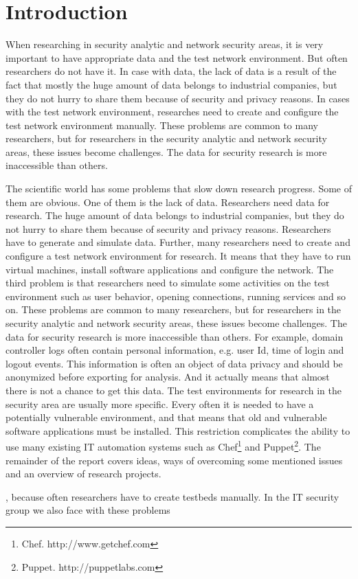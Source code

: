 \section{Introduction}


When researching in security analytic and network security areas, it is very important to have appropriate data and the test network environment. But often researchers do not have it. In case with data, the lack of data is a result of the fact that mostly the huge amount of data belongs to industrial companies, but they do not hurry to share them because of security and privacy reasons. In cases with the test network environment, researches need to create and configure the test network environment manually. These problems are common to many researchers, but for researchers in the security analytic and network security areas, these issues become challenges. The data for security research is more inaccessible than others.   


The scientific world has some problems that slow down research progress. Some of them are obvious. One of them is the lack of data. Researchers need data for research. The huge amount of data belongs to industrial companies, but they do not hurry to share them because of security and privacy reasons. Researchers have to generate and simulate data. Further, many researchers need to create and configure a test network environment for research. It means that they have to run virtual machines, install software applications and configure the network. The third problem is that researchers need to simulate some activities on the test environment such as user behavior, opening connections, running services and so on. These problems are common to many researchers, but for researchers in the security analytic and network security areas, these issues become challenges. The data for security research is more inaccessible than others. For example, domain controller logs often contain personal information, e.g. user Id, time of login and logout events. This information is often an object of data privacy and should be anonymized before exporting for analysis. And it actually means that almost there is not a chance to get this data. The test environments for research in the security area are usually more specific. Every often it is needed to have a potentially vulnerable environment, and that means that old and vulnerable software applications must be installed. This restriction complicates the ability to use many existing IT automation systems such as Chef\footnote{Chef. http://www.getchef.com} and Puppet\footnote{Puppet. http://puppetlabs.com}. The remainder of the report covers ideas, ways of overcoming some mentioned issues and an overview of research projects.



, because often researchers have to create testbeds manually. In the IT security group we also face with these problems